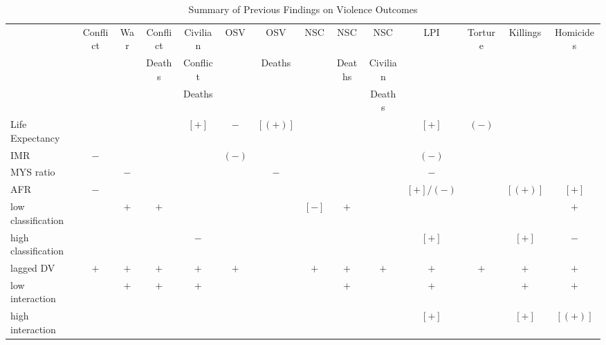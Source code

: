 \begin{landscape}
\begin{table}[!htbp]
\small
\centering
\caption{Summary of Previous Findings on Violence Outcomes}
\label{table_panel_violence}
\begin{tabular}{lc|c|c|c|c|c|c|c|c|c|c|c|c}

\toprule
                        & Conflict & War & Conflict & Civilian & OSV   & OSV     & NSC   & NSC    & NSC      & LPI       & Torture & Killings & Homicides \\
                        &          &     & Deaths   & Conflict &       & Deaths  &       & Deaths & Civilian &           &         &          & \\
                        &          &     &          & Deaths   &       &         &       &        & Deaths   &           &         &          & \\
\midrule
Life Expectancy         &          &     &          & $[+]$    & $-$   & $[(+)]$ &       &        &          & $[+]$     & $(-)$   &          & \\
IMR                     & $-$      &     &          &          & $(-)$ &         &       &        &          & $(-)$     &         &          & \\
MYS ratio               &          & $-$ &          &          &       & $-$     &       &        &          & $-$       &         &          & \\
AFR                     & $-$      &     &          &          &       &         &       &        &          & $[+]/(-)$ &         & $[(+)]$  & $[+]$ \\
low classification      &          & $+$ & $+$      &          &       &         & $[-]$ & $+$    &          &           &         &          & $+$ \\
high classification     &          &     &          & $-$      &       &         &       &        &          & $[+]$     &         & $[+]$    & $-$ \\
lagged DV               & $+$      & $+$ & $+$      & $+$      & $+$   &         & $+$   & $+$    & $+$      & $+$       & $+$     & $+$      & $+$ \\
\qquad low interaction  &          & $+$ & $+$      & $+$      &       &         &       & $+$    &          & $+$       &         & $+$      & $+$ \\
\qquad high interaction &          &     &          &          &       &         &       &        &          & $[+]$     &         & $[+]$    & $[(+)]$ \\
\bottomrule
\end{tabular}
\end{table}
\end{landscape}

